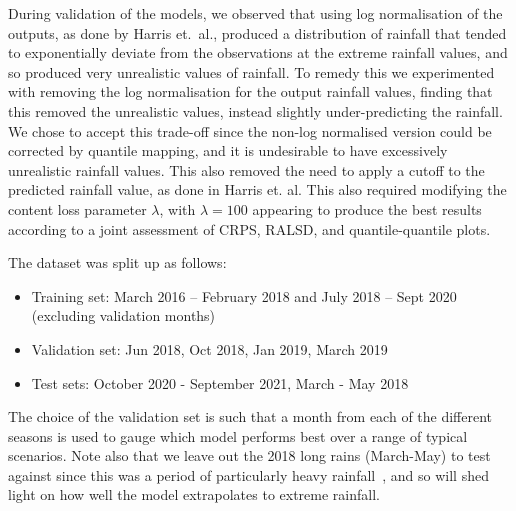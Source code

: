 \documentclass{article}
\begin{document}
During validation of the models, we observed that using log normalisation of the outputs, as done by Harris et.~al., produced a distribution of rainfall that tended to exponentially deviate from the observations at the extreme rainfall values, and so produced very unrealistic values of rainfall. To remedy this we experimented with removing the log normalisation for the output rainfall values, finding that this removed the unrealistic values, instead slightly under-predicting the rainfall. We chose to accept this trade-off since the non-log normalised version could be corrected by quantile mapping, and it is undesirable to have excessively unrealistic rainfall values. This also removed the need to apply a cutoff to the predicted rainfall value, as done in Harris et. al. This also required modifying the content loss parameter $\lambda$, with $\lambda=100$ appearing to produce the best results according to a joint assessment of CRPS, RALSD, and quantile-quantile plots.

The dataset was split up as follows:
\begin{itemize}
    \item Training set: March 2016 – February 2018 and July 2018 – Sept 2020 (excluding validation months)
    \item Validation set: Jun 2018, Oct 2018, Jan 2019, March 2019
    \item Test sets: October 2020 - September 2021, March - May 2018
\end{itemize}
The choice of the validation set is such that a month from each of the different seasons is used to gauge which model performs best over a range of typical scenarios. Note also that we leave out the 2018 long rains (March-May) to test against since this was a period of particularly heavy rainfall~\citep{kilavi_extreme_2018}, and so will shed light on how well the model extrapolates to extreme rainfall. 
\end{document}

